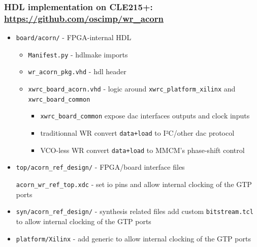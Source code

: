 \documentclass[compress,10pt,aspectratio=169]{beamer}
\begin{document}
\begin{frame}[fragile]\frametitle{HDL implementation on CLE215+: {\footnotesize\url{https://github.com/oscimp/wr_acorn}}}

  \begin{itemize}
    \item \texttt{board/acorn/} - FPGA-internal HDL
      \begin{itemize}
        \item \texttt{Manifest.py} - hdlmake imports
        \item \texttt{wr\_acorn\_pkg.vhd} - hdl header
        \item \texttt{xwrc\_board\_acorn.vhd} - logic around \texttt{xwrc\_platform\_xilinx} and \texttt{xwrc\_board\_common}
          \begin{itemize}
            \item \texttt{xwrc\_board\_common} expose dac interfaces outputs and clock inputs
            \item traditionnal WR convert \texttt{data+load} to I²C/other dac protocol
            \item VCO-less WR convert \texttt{data+load} to MMCM's phase-shift control
          \end{itemize}
      \end{itemize}
    \item \texttt{top/acorn\_ref\_design/} - FPGA/board interface files

          \texttt{acorn\_wr\_ref\_top.xdc} - set io pins and allow internal clocking of the GTP ports
    \item \texttt{syn/acorn\_ref\_design/} - synthesis related files
          add custom \texttt{bitstream.tcl} to allow internal clocking of the GTP ports
    \item \texttt{platform/Xilinx} - add generic to allow internal clocking of the GTP ports
  \end{itemize}

\end{frame}
\end{document}
